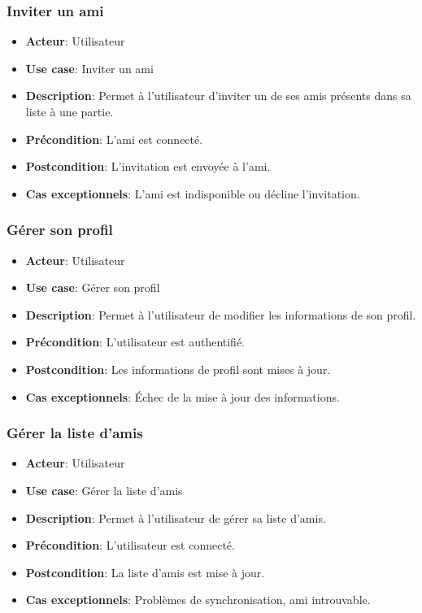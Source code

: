 \documentclass{article}
\begin{document}
\subsubsection*{Inviter un ami}
\begin{itemize}
    \item \textbf{Acteur}: Utilisateur
    \item \textbf{Use case}: Inviter un ami
    \item \textbf{Description}: Permet à l'utilisateur d'inviter un de ses amis présents dans sa liste à une partie.
    \item \textbf{Précondition}: L'ami est connecté.
    \item \textbf{Postcondition}: L'invitation est envoyée à l'ami.
    \item \textbf{Cas exceptionnels}: L'ami est indisponible ou décline l'invitation.
\end{itemize}

\subsubsection*{Gérer son profil}
\begin{itemize}
    \item \textbf{Acteur}: Utilisateur
    \item \textbf{Use case}: Gérer son profil
    \item \textbf{Description}: Permet à l'utilisateur de modifier les informations de son profil.
    \item \textbf{Précondition}: L'utilisateur est authentifié.
    \item \textbf{Postcondition}: Les informations de profil sont mises à jour.
    \item \textbf{Cas exceptionnels}: Échec de la mise à jour des informations.
\end{itemize}

\subsubsection*{Gérer la liste d'amis}
\begin{itemize}
    \item \textbf{Acteur}: Utilisateur
    \item \textbf{Use case}: Gérer la liste d'amis
    \item \textbf{Description}: Permet à l'utilisateur de gérer sa liste d'amis.
    \item \textbf{Précondition}: L'utilisateur est connecté.
    \item \textbf{Postcondition}: La liste d'amis est mise à jour.
    \item \textbf{Cas exceptionnels}: Problèmes de synchronisation, ami introuvable.
\end{itemize}
\end{document}
